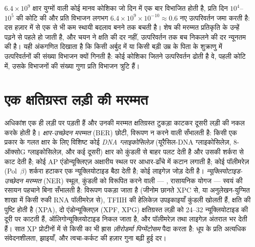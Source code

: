 \begin{example}[विक्षतियाँ बनाम उत्परिवर्तन]\label{ex:b3:dna-repair:numbers}
$6.4\times 10^{9}$ क्षार युग्मों वाली कोई मानव कोशिका जो दिन में एक बार
विभाजित होती है, प्रति दिन $10^{4}$--$10^{5}$ की कोटि की  और
प्रति विभाजन लगभग $6.4\times 10^{9}\times 10^{-10} \approx 0.6$ नए
उत्परिवर्तन जमा करती है: दस हज़ार  में से एक से भी कम स्थायी
बदलाव बनने तक बचती है। शेष की मरम्मत प्रतिकृति के उन्हें पढ़ने से पहले
हो जाती है, और चयन ने क्षति की दर नहीं, उत्परिवर्तन तक बच निकलने की दर
न्यूनतम की है। यही अंकगणित दिखाता है कि किसी अर्बुद में या किसी बड़ी
उम्र के पिता के शुक्राणु में उत्परिवर्तनों की संख्या विभाजन क्यों गिनती
है: कोई कोशिका जितने उत्परिवर्तन ढोती है वे, पहली कोटि में, उसके
विभाजनों की संख्या गुणा प्रति विभाजन त्रुटि हैं।
\end{example}

\section{एक क्षतिग्रस्त लड़ी की मरम्मत}

\begin{definition}[उच्छेदन मरम्मत]\label{def:b3:dna-repair:excision}
अधिकांश  एक ही लड़ी पर पड़ती हैं और उनकी मरम्मत क्षतिग्रस्त
टुकड़ा काटकर दूसरी लड़ी की नकल करके होती है। \emph{क्षार-उच्छेदन मरम्मत}
(BER) छोटी, विरूपण न करने वाली  सँभालती है: किसी एक प्रकार के
गलत क्षार के लिए विशिष्ट कोई \emph{DNA ग्लाइकोसिलेज़}
(यूरैसिल-DNA ग्लाइकोसिलेज़, 8-ऑक्सोG ग्लाइकोसिलेज़, और कई दूसरी) क्षार
को कुंडली से बाहर पलट देती है और उसकी शर्करा से काट देती है; कोई AP
एंडोन्यूक्लिएज़ अक्षारीय स्थल पर आधार-ढाँचे में कटान लगाती है; कोई
पॉलीमरेज़ (Pol~$\beta$) शर्करा हटाकर एक न्यूक्लियोटाइड बैठा देती है;
कोई लाइगेज़ जोड़ देती है। \emph{न्यूक्लियोटाइड-उच्छेदन मरम्मत}
(NER) स्थूल, कुंडली को विरूपित करने वाली  --- , रासायनिक योगज --- स्वयं  की रसायन पहचाने बिना सँभालती
है: विरूपण पकड़ा जाता है (जीनोम छानते XPC से, या अनुलेखन-युग्मित शाखा
में किसी रुकी RNA पॉलीमरेज़ से), TFIIH की हेलिकेज़ उपइकाइयाँ कुंडली
खोलती हैं, क्षति की पुष्टि होती है (XPA), दो एंडोन्यूक्लिएज़ (XPF, XPG)
क्षतिग्रस्त लड़ी को \numrange{24}{32} न्यूक्लियोटाइड की दूरी पर काटती
हैं, ऑलिगोन्यूक्लियोटाइड निकल जाता है, और पॉलीमरेज़ तथा लाइगेज़ अंतराल
भर देती हैं। सात XP प्रोटीनों में से किसी का भी ह्रास
\emph{ज़ीरोडर्मा पिग्मेंटोसम} पैदा करता है: धूप के प्रति अत्यधिक
संवेदनशीलता, झाइयाँ, और त्वचा-कर्कट की हज़ार गुना बढ़ी हुई दर।
\end{definition}

